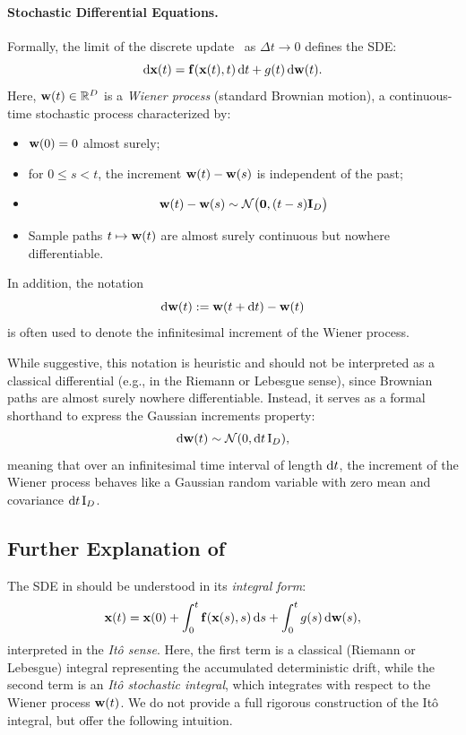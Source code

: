 \paragraph{Stochastic Differential Equations.}
Formally, the limit of the discrete update~ as $ \Delta t \to 0 $ defines the SDE:
\begin{equation}
    \mathop{}\!\mathrm{d} {\mathbf{x}}(t) = {\mathbf{f}}({\mathbf{x}}(t), t)\mathop{}\!\mathrm{d} t + g(t) \mathop{}\!\mathrm{d} {\mathbf{w}}(t).
    \label{eq:sde}
\end{equation}
Here, $ {\mathbf{w}}(t) \in \mathbb{R}^D $ is a \emph{Wiener process} (standard Brownian motion), a continuous-time stochastic process characterized by:
\begin{itemize}
    \item {} $ {\mathbf{w}}(0) = 0 $ almost surely;
    \item {}  for $ 0 \leq s < t $, the increment $ {\mathbf{w}}(t) - {\mathbf{w}}(s) $ is independent of the past;
    \item {} 
    \begin{align}\label{eq:wiener-gaussian}
        {\mathbf{w}}(t) - {\mathbf{w}}(s) \sim \mathcal{N}\bigl(\bm{0}, (t - s){\mathbf{I}}_D \bigr)
    \end{align}
    \item {} Sample paths $ t \mapsto {\mathbf{w}}(t) $ are almost surely continuous but nowhere differentiable.
\end{itemize}
In addition, the notation
\[
\mathop{}\!\mathrm{d} {\mathbf{w}}(t) := {\mathbf{w}}(t + \mathop{}\!\mathrm{d} t) - {\mathbf{w}}(t)
\]
is often used to denote the infinitesimal increment of the Wiener process. 

While suggestive, this notation is heuristic and should not be interpreted as a classical differential (e.g., in the Riemann or Lebesgue sense), since Brownian paths are almost surely nowhere differentiable. Instead, it serves as a formal shorthand to express the Gaussian increments property:
\[
\mathop{}\!\mathrm{d} {\mathbf{w}}(t) \sim \mathcal{N}(0, \mathop{}\!\mathrm{d} t\, \mathrm{I}_D),
\]
meaning that over an infinitesimal time interval of length $ \mathop{}\!\mathrm{d} t $, the increment of the Wiener process behaves like a Gaussian random variable with zero mean and covariance $ \mathop{}\!\mathrm{d} t\, \mathrm{I}_D $.




\subsection{Further Explanation of }
The SDE in  should be understood in its \emph{integral form}:
\begin{align}\label{eq:sde-integral-form}
    {\mathbf{x}}(t) = {\mathbf{x}}(0) + \int_0^t {\mathbf{f}}({\mathbf{x}}(s), s) \mathop{}\!\mathrm{d} s + \int_0^t g(s) \mathop{}\!\mathrm{d} {\mathbf{w}}(s),
\end{align}
interpreted in the \emph{Itô sense}.
Here, the first term is a classical (Riemann or Lebesgue) integral representing the accumulated deterministic drift, while the second term is an \emph{Itô stochastic integral}, which integrates with respect to the Wiener process $ {\mathbf{w}}(t) $. We do not provide a full rigorous construction of the Itô integral, but offer the following intuition.


